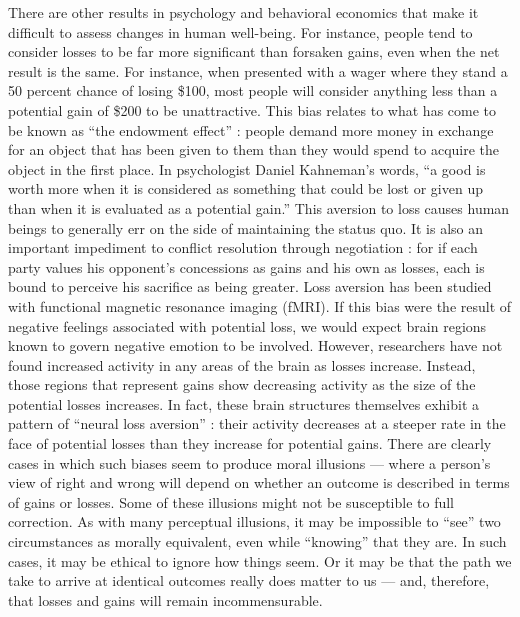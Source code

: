 \documentclass[a4paper,14pt]{extbook}
\begin{document}
There are other results in psychology and behavioral economics that make it difficult to assess changes in human well-being.
For instance, people tend to consider losses to be far more significant than forsaken gains, even when the net result is the same.
For instance, when presented with a wager where they stand a 50 percent chance of losing \$100, most people will consider anything less than a potential gain of \$200 to be unattractive.
This bias relates to what has come to be known as ``the endowment effect'' :
people demand more money in exchange for an object that has been given to them than they would spend to acquire the object in the first place.
In psychologist Daniel Kahneman's words, ``a good is worth more when it is considered as something that could be lost or given up than when it is evaluated as a potential gain.''
This aversion to loss causes human beings to generally err on the side of maintaining the status quo.
It is also an important impediment to conflict resolution through negotiation :
for if each party values his opponent's concessions as gains and his own as losses, each is bound to perceive his sacrifice as being greater.
Loss aversion has been studied with functional magnetic resonance imaging (fMRI).
If this bias were the result of negative feelings associated with potential loss, we would expect brain regions known to govern negative emotion to be involved.
However, researchers have not found increased activity in any areas of the brain as losses increase.
Instead, those regions that represent gains show decreasing activity as the size of the potential losses increases.
In fact, these brain structures themselves exhibit a pattern of ``neural loss aversion'' :
their activity decreases at a steeper rate in the face of potential losses than they increase for potential gains.
There are clearly cases in which such biases seem to produce moral illusions --- where a person's view of right and wrong will depend on whether an outcome is described in terms of gains or losses.
Some of these illusions might not be susceptible to full correction.
As with many perceptual illusions, it may be impossible to ``see'' two circumstances as morally equivalent, even while ``knowing'' that they are.
In such cases, it may be ethical to ignore how things seem.
Or it may be that the path we take to arrive at identical outcomes really does matter to us --- and, therefore, that losses and gains will remain incommensurable.
\end{document}
